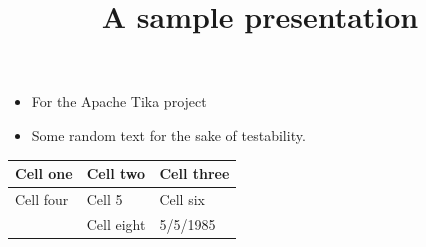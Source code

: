 \documentclass[11pt,a4paper]{article}
\title{A sample presentation}
\begin{document}
\maketitle

\begin{itemize}
\item For the Apache Tika project
\end{itemize}

\begin{itemize}
\item Some random text for the sake of testability.
\end{itemize}

\begin{table}[h]
\begin{tabular}{|l|l|l|}
\hline
Cell one & Cell two & Cell three \\ \hline
Cell four & Cell 5 & Cell six \\ \hline
 & Cell eight & 5/5/1985 \\ \hline
\end{tabular}
\end{table}
\end{document}
